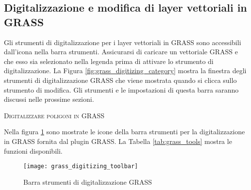 \subsection{Digitalizzazione e modifica di layer vettoriali in GRASS}\label{grass_digitising}

Gli strumenti di digitalizzazione per i layer vettoriali in GRASS sono
accessibili dall'icona 
nella barra strumenti. Assicurarsi di caricare un vettoriale GRASS e che esso
sia selezionato nella legenda prima di attivare lo strumento di
digitalizzazione. La Figura \ref{fig:grass_digitizing_category} mostra la
finestra degli strumenti di digitalizzazione GRASS che viene mostrata quando
si clicca sullo strumento di modifica. Gli strumenti e le impostazioni di
questa barra saranno discussi nelle prossime sezioni.

\begin{Tip}\caption{\textsc{Digitalizzare poligoni in GRASS}}
\end{Tip} 

\label{label_grasstoolbar}

Nella figura \ref{fig:grass_digitizing_toolbar} sono mostrate le icone della
barra strumenti per la digitalizzazione in GRASS fornita dal plugin GRASS. La
Tabella \ref{tab:grass_tools} mostra le funzioni disponibili.

\begin{figure}[h]
   \begin{center}
   \caption{Barra strumenti di digitalizzazione GRASS \nixcaption}\label{fig:grass_digitizing_toolbar} 
   \texttt{[image: grass\_digitizing\_toolbar]}
\end{center}  
\end{figure}

